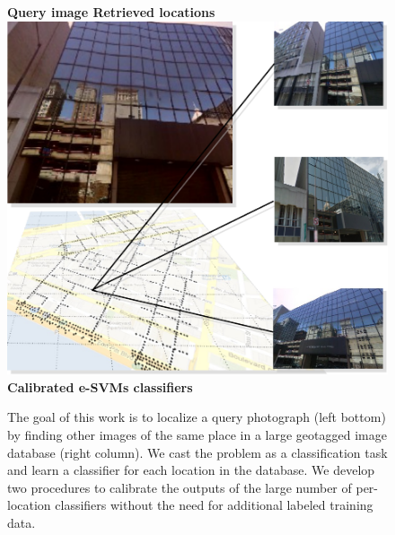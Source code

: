 \maketitle

\begin{figure}[th]
  \textbf{
    \hspace{0.15\linewidth}Query image\hspace{0.3\linewidth} Retrieved locations \hspace{0.05\linewidth}
  }
  \includegraphics[width=1.0\linewidth]{imgs/titleVertical.pdf}
  \textbf{\textcolor{white}{\quad\quad}Calibrated e-SVMs classifiers}
  \caption{
          The goal of this work is to localize a query photograph (left bottom) by finding other images of the same place in a large geotagged image database (right column). We cast the problem as a classification task and learn a classifier for each location in the database. 
          We develop two procedures to calibrate the outputs of the large number of per-location classifiers without the need for additional labeled training data.
        }
\end{figure}

